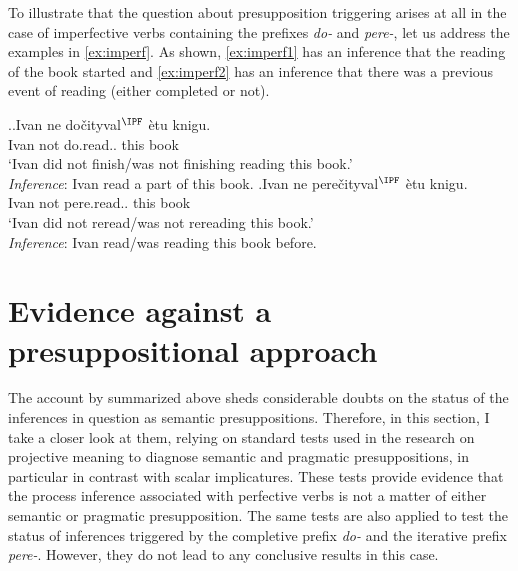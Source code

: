 
To illustrate that the question about presupposition triggering arises at all in the case of imperfective verbs containing the prefixes \textit{do-} and \textit{pere-}, let us address the examples in \ref{ex:imperf}. As shown,  \ref{ex:imperf1} has an inference that the reading of the book started and \ref{ex:imperf2} has an inference that there was a previous event of reading (either completed or not).

\ex.\label{ex:imperf}\ag.\label{ex:imperf1}Ivan ne do\v{c}ityval$^{\IPF}$ \`{e}tu knigu.\\
Ivan not do.read.. this book\\
\trans `Ivan did not finish/was not finishing reading this book.'\\
\textit{Inference}: Ivan read a part of this book.
\bg.\label{ex:imperf2}Ivan ne pere\v{c}ityval$^{\IPF}$ \`{e}tu knigu.\\
Ivan not pere.read.. this book\\
\trans `Ivan did not reread/was not rereading this book.'\\
\textit{Inference}: Ivan read/was reading this book before.

\section{Evidence against a presuppositional approach}\label{sec:pragm:tests}
The account by \citet{Gronn:04, Gronn:06} summarized above sheds considerable doubts on the status of the inferences in question as semantic presuppositions. Therefore, in this section, I take a closer look at them, relying on standard tests used in the research on projective meaning to diagnose semantic and pragmatic presuppositions, in particular in contrast with scalar implicatures. These tests provide evidence that the process inference associated with perfective verbs is not a matter of either semantic or pragmatic presupposition. The same tests are also applied to test the status of inferences triggered by the completive prefix \textit{do-} and the iterative prefix \textit{pere-}. However, they do not lead to any conclusive results in this case.

